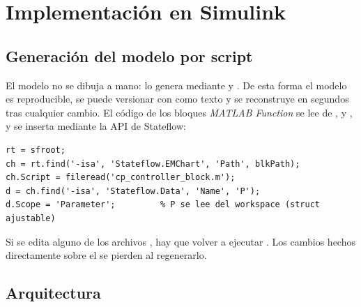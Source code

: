 \chapter{Implementación en Simulink}
\label{cap:simulink}

\section{Generación del modelo por script}

El modelo  no se dibuja a mano: lo genera  mediante  y . De esta forma el modelo es reproducible, se puede versionar con  como texto y se reconstruye en segundos tras cualquier cambio. El código de los bloques \emph{MATLAB Function} se lee de ,  y , y se inserta mediante la API de Stateflow:

\begin{lstlisting}[caption={Inserción del código de un bloque \emph{MATLAB Function} y declaración de \code{P} como parámetro.}]
rt = sfroot;
ch = rt.find('-isa', 'Stateflow.EMChart', 'Path', blkPath);
ch.Script = fileread('cp_controller_block.m');
d = ch.find('-isa', 'Stateflow.Data', 'Name', 'P');
d.Scope = 'Parameter';         % P se lee del workspace (struct ajustable)
\end{lstlisting}

\begin{aviso}
Si se edita alguno de los archivos , hay que volver a ejecutar . Los cambios hechos directamente sobre el  se pierden al regenerarlo.
\end{aviso}

\section{Arquitectura}

